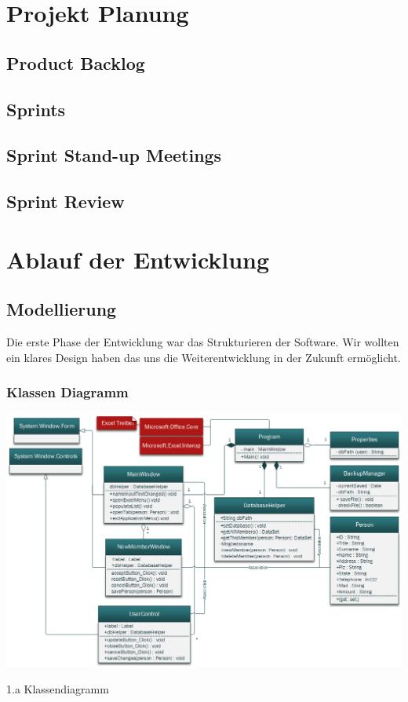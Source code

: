 \documentclass{article}
\begin{document}
\newpage

\section{Projekt Planung}
\subsection{Product Backlog}
\subsection{Sprints}
\subsection{Sprint Stand-up Meetings}
\subsection{Sprint Review}

\newpage

\section{Ablauf der Entwicklung}

\subsection{Modellierung}
Die erste Phase der Entwicklung war das Strukturieren der Software. Wir wollten ein klares Design haben das uns die Weiterentwicklung in der Zukunft ermöglicht. 

\subsubsection{Klassen Diagramm}
\begin{center}
	\includegraphics[width=1.05 \textwidth]{KlassendiagrammBild}
	\caption{1.a Klassendiagramm}
\end{center}
\end{document}
